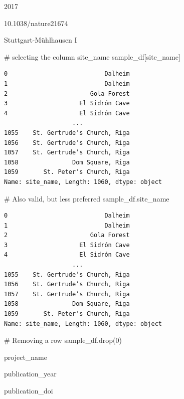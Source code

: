 \documentclass[
  letterpaper,
]{book}
\newenvironment{Shaded}{}{}
\newcommand{\CommentTok}[1]{\textcolor[rgb]{0.42,0.45,0.49}{#1}}
\newcommand{\DecValTok}[1]{\textcolor[rgb]{0.00,0.36,0.77}{#1}}
\newcommand{\NormalTok}[1]{\textcolor[rgb]{0.14,0.16,0.18}{#1}}
\newcommand{\StringTok}[1]{\textcolor[rgb]{0.01,0.18,0.38}{#1}}
\begin{document}
2017

10.1038/nature21674

Stuttgart-Mühlhausen I

\begin{Shaded}
\begin{Highlighting}[]
\CommentTok{\# selecting the column site\_name}
\NormalTok{sample\_df[}\StringTok{\textquotesingle{}site\_name\textquotesingle{}}\NormalTok{]}
\end{Highlighting}
\end{Shaded}

\begin{verbatim}
0                           Dalheim
1                           Dalheim
2                       Gola Forest
3                    El Sidrón Cave
4                    El Sidrón Cave
                   ...
1055    St. Gertrude’s Church, Riga
1056    St. Gertrude’s Church, Riga
1057    St. Gertrude’s Church, Riga
1058               Dom Square, Riga
1059       St. Peter’s Church, Riga
Name: site_name, Length: 1060, dtype: object
\end{verbatim}

\begin{Shaded}
\begin{Highlighting}[]
\CommentTok{\# Also valid, but less preferred}
\NormalTok{sample\_df.site\_name}
\end{Highlighting}
\end{Shaded}

\begin{verbatim}
0                           Dalheim
1                           Dalheim
2                       Gola Forest
3                    El Sidrón Cave
4                    El Sidrón Cave
                   ...
1055    St. Gertrude’s Church, Riga
1056    St. Gertrude’s Church, Riga
1057    St. Gertrude’s Church, Riga
1058               Dom Square, Riga
1059       St. Peter’s Church, Riga
Name: site_name, Length: 1060, dtype: object
\end{verbatim}

\begin{Shaded}
\begin{Highlighting}[]
\CommentTok{\# Removing a row}
\NormalTok{sample\_df.drop(}\DecValTok{0}\NormalTok{)}
\end{Highlighting}
\end{Shaded}

project\_name

publication\_year

publication\_doi
\end{document}
